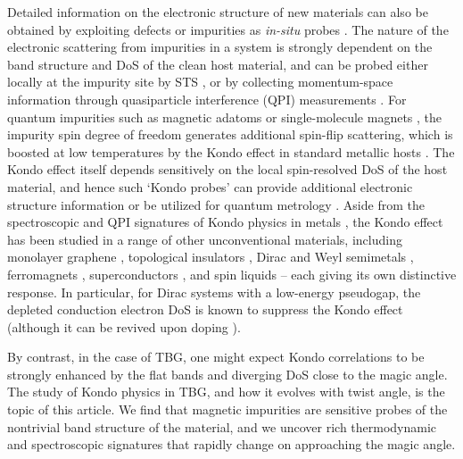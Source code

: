 Detailed information on the electronic structure of new materials can also be obtained by exploiting defects or impurities as \textit{in-situ} probes \cite{crommie1993imaging}. The nature of the electronic scattering from impurities in a system is strongly dependent on the band structure and DoS of the clean host material, and can be probed either locally at the impurity site by STS \cite{jamneala2000scanning,madhavan2001local}, or by collecting momentum-space information through quasiparticle interference (QPI) measurements \cite{hoffman2002imaging}. For quantum impurities such as magnetic adatoms \cite{costi2009kondo,ternes2008spectroscopic} or single-molecule magnets \cite{bogani2008molecular}, the impurity spin degree of freedom generates additional spin-flip scattering, which is boosted at low temperatures by the Kondo effect in standard metallic hosts \cite{Hewson}. The Kondo effect itself depends sensitively on the local spin-resolved DoS of the host material, and hence such `Kondo probes' can provide additional electronic structure information \cite{derry2015quasiparticle,*mitchell2015multiple} or be utilized for quantum metrology \cite{mihailescu2022thermometry}. Aside from the spectroscopic and QPI signatures of Kondo physics in metals \cite{ternes2008spectroscopic}, the Kondo effect has been studied in a range of other unconventional materials, including monolayer graphene \cite{chen2011tunable,vojta2010gate,Fritz2013,mitchell2013kondo}, topological insulators \cite{mitchell2013TI}, Dirac and Weyl semimetals \cite{mitchell2015kondo}, ferromagnets \cite{martinek2003kondo,calvo2009kondo}, superconductors \cite{muller1971kondo,polkovnikov2001impurity}, and spin liquids \cite{kolezhuk2006theory,vojta2016kondo,he2022magnetic} -- each giving its own distinctive response. In particular, for Dirac systems with a low-energy pseudogap, the depleted conduction electron DoS is known to suppress the Kondo effect \cite{Fritz2013,mitchell2013TI,mitchell2015kondo} (although it can be revived upon doping \cite{May2018PRB-Kondo-graphene}).

By contrast, in the case of TBG, one might expect Kondo correlations to be strongly enhanced by the flat bands and diverging DoS close to the magic angle. The study of Kondo physics in TBG, and how it evolves with twist angle, is the topic of this article. We find that magnetic impurities are sensitive probes of the nontrivial band structure of the material, and we uncover rich thermodynamic and spectroscopic signatures that rapidly change on approaching the magic angle.


